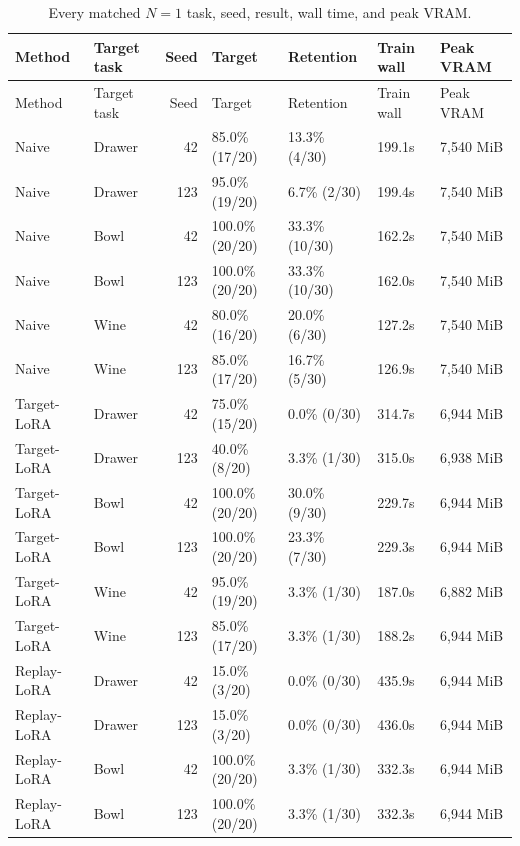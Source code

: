 \documentclass[10pt]{extarticle}
\newcommand{\score}[3]{#1\% (#2/#3)}
\begin{document}
{\footnotesize
\begin{longtable}{@{}llrllll@{}}
\caption{Every matched \(N=1\) task, seed, result, wall time, and peak VRAM.}
\label{tab:all-n1}\\
\toprule
Method & Target task & Seed & Target & Retention & Train wall & Peak VRAM\\
\midrule
\endfirsthead
\toprule
Method & Target task & Seed & Target & Retention & Train wall & Peak VRAM\\
\midrule
\endhead
Naive & Drawer & 42 & \score{85.0}{17}{20} & \score{13.3}{4}{30} & 199.1s & 7,540 MiB\\
Naive & Drawer & 123 & \score{95.0}{19}{20} & \score{6.7}{2}{30} & 199.4s & 7,540 MiB\\
Naive & Bowl & 42 & \score{100.0}{20}{20} & \score{33.3}{10}{30} & 162.2s & 7,540 MiB\\
Naive & Bowl & 123 & \score{100.0}{20}{20} & \score{33.3}{10}{30} & 162.0s & 7,540 MiB\\
Naive & Wine & 42 & \score{80.0}{16}{20} & \score{20.0}{6}{30} & 127.2s & 7,540 MiB\\
Naive & Wine & 123 & \score{85.0}{17}{20} & \score{16.7}{5}{30} & 126.9s & 7,540 MiB\\
\midrule
Target-LoRA & Drawer & 42 & \score{75.0}{15}{20} & \score{0.0}{0}{30} & 314.7s & 6,944 MiB\\
Target-LoRA & Drawer & 123 & \score{40.0}{8}{20} & \score{3.3}{1}{30} & 315.0s & 6,938 MiB\\
Target-LoRA & Bowl & 42 & \score{100.0}{20}{20} & \score{30.0}{9}{30} & 229.7s & 6,944 MiB\\
Target-LoRA & Bowl & 123 & \score{100.0}{20}{20} & \score{23.3}{7}{30} & 229.3s & 6,944 MiB\\
Target-LoRA & Wine & 42 & \score{95.0}{19}{20} & \score{3.3}{1}{30} & 187.0s & 6,882 MiB\\
Target-LoRA & Wine & 123 & \score{85.0}{17}{20} & \score{3.3}{1}{30} & 188.2s & 6,944 MiB\\
\midrule
Replay-LoRA & Drawer & 42 & \score{15.0}{3}{20} & \score{0.0}{0}{30} & 435.9s & 6,944 MiB\\
Replay-LoRA & Drawer & 123 & \score{15.0}{3}{20} & \score{0.0}{0}{30} & 436.0s & 6,944 MiB\\
Replay-LoRA & Bowl & 42 & \score{100.0}{20}{20} & \score{3.3}{1}{30} & 332.3s & 6,944 MiB\\
Replay-LoRA & Bowl & 123 & \score{100.0}{20}{20} & \score{3.3}{1}{30} & 332.3s & 6,944 MiB\\

\end{longtable}}
\end{document}
